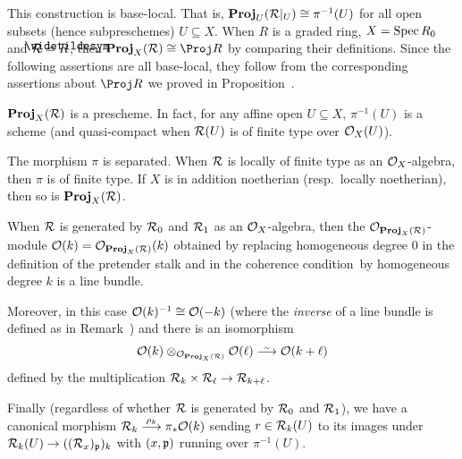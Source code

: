 \documentclass[a4paper,parskip=half,numbers=enddot, DIV=12]{scrreprt}
\begin{document}
This construction is base-local. That is, $\operatorname{\mathbf{Proj}}_U(\mathcal{R}|_U)\cong \pi^{-1}(U)$ for all open subsets (hence subpreschemes) $U\subseteq X$. When $R$ is a graded ring, $X=\operatorname{Spec} R_0$ and $\Rr=\snake{R}$, then $\PROJ_X(\Rr)\cong \Proj R$ by comparing their definitions. Since the following assertions are all base-local, they follow from the corresponding assertions about $\Proj R$ we proved in Proposition~.
\begin{fact}
	\begin{alphanumerate}
		\item {}$\operatorname{\mathbf{Proj}}_X(\mathcal{R})$ is a prescheme. In fact, for any affine open $U\subseteq X$, $\pi^{-1}(U)$ is a scheme (and quasi-compact when $\mathcal{R}(U)$ is of finite type over $\mathcal{O}_X(U)$).
		\item The morphism $\pi$ is separated. When $\mathcal{R}$ is locally of finite type as an $\mathcal{O}_X$-algebra, then $\pi$ is of finite type. If $X$ is in addition noetherian (resp.\ locally noetherian), then so is $\operatorname{\mathbf{Proj}}_X(\mathcal{R})$.
		\item When $\mathcal{R}$ is generated by $\mathcal{R}_0$ and $\mathcal{R}_1$ as an $\mathcal{O}_X$-algebra, then the $\mathcal{O}_{\operatorname{\mathbf{Proj}}_X(\mathcal{R})}$-module $\mathcal{O}(k)=\mathcal{O}_{\operatorname{\mathbf{Proj}}_X(\mathcal{R})}(k)$ obtained by replacing homogeneous degree $0$ in the definition of the pretender stalk and in the coherence condition\texttrademark\ by homogeneous degree $k$ is a line bundle. 
		
		Moreover, in this case $\mathcal{O}(k)^{-1}\cong \mathcal{O}(-k)$ (where the \emph{inverse} of a line bundle is defined as in Remark~) and there is an isomorphism 
		\begin{align*}
			\Oo(k)\otimes_{\Oo_{\PROJ_X(\Rr)}}\Oo(\ell)\isomorphism\Oo(k+\ell)
		\end{align*}
		defined by the multiplication $\Rr_k\times \Rr_\ell\morphism\Rr_{k+\ell}$.
		\item Finally (regardless of whether $\mathcal{R}$ is generated by $\mathcal{R}_0$ and $\mathcal{R}_1$), we have a canonical morphism $\Rr_k\morphism[\rho_k]\pi_*\Oo(k)$ sending $r\in\mathcal{R}_k(U)$ to its images under $\Rr_k(U)\morphism ((\Rr_x)_\pp)_k$ with $(x,\mathfrak{p})$ running over $\pi^{-1}(U)$.
	\end{alphanumerate}
\end{fact}
\end{document}
